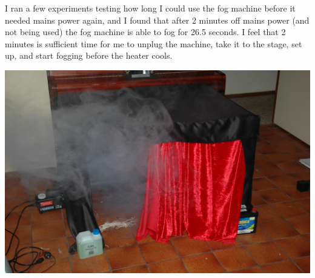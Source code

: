 			I ran a few experiments testing how long I could use the fog machine before it needed mains power again, and I found that after 2 minutes off mains power (and not being used) the fog machine is able to fog for 26.5 seconds. I feel that 2 minutes is sufficient time for me to unplug the machine, take it to the stage, set up, and start fogging before the heater cools.\\
			
			\centerline{\includegraphics[width=0.75\linewidth]{images/FogTest}}